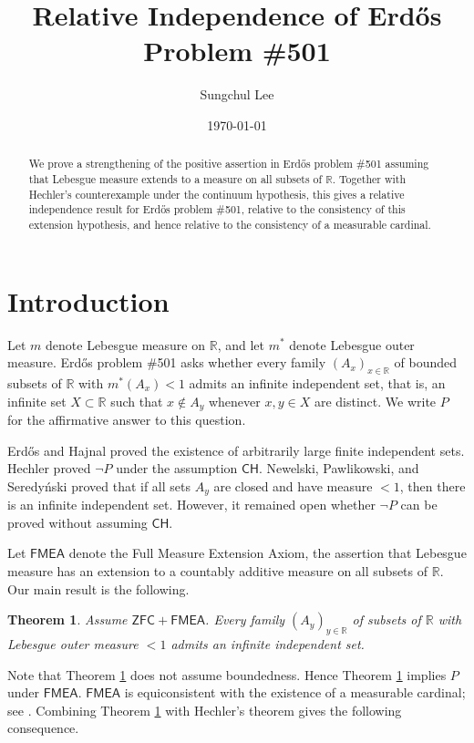 \documentclass{amsart}
\title{Relative Independence of Erd\H{o}s Problem \#501}
\author{Sungchul Lee}
\date{\today}
\theoremstyle{plain}
\newtheorem{theorem}{Theorem}[section]
\theoremstyle{definition}
\newcommand{\R}{\mathbb{R}}
\newcommand{\ZFC}{\mathsf{ZFC}}
\newcommand{\FMEA}{\mathsf{FMEA}}
\newcommand{\CH}{\mathsf{CH}}
\begin{document}
\begin{abstract}
We prove a strengthening of the positive assertion in Erd\H{o}s problem \#501 assuming that Lebesgue measure extends to a measure on all subsets of $\R$.
Together with Hechler's counterexample under the continuum hypothesis, this gives a relative independence result for Erd\H{o}s problem \#501, relative to the consistency of this extension hypothesis, and hence relative to the consistency of a measurable cardinal.
\end{abstract}

\maketitle

\section{Introduction}

Let $m$ denote Lebesgue measure on $\R$, and let $m^*$ denote Lebesgue outer measure.
Erd\H{o}s problem \#501 \cite{ErdosProblems501} asks whether every family $(A_x)_{x\in\R}$ of bounded subsets of $\R$ with $m^*(A_x)<1$ admits an infinite independent set, that is, an infinite set $X\subset\R$ such that $x\notin A_y$ whenever $x,y\in X$ are distinct.
We write $P$ for the affirmative answer to this question.

Erd\H{o}s and Hajnal \cite{ErdosHajnal1960} proved the existence of arbitrarily large finite independent sets.
Hechler \cite{Hechler1972} proved $\neg P$ under the assumption $\CH$.
Newelski, Pawlikowski, and Seredy\'nski \cite{NPS1987} proved that if all sets $A_y$ are closed and have measure $<1$, then there is an infinite independent set.
However, it remained open whether $\neg P$ can be proved without assuming $\CH$.

Let $\FMEA$ denote the Full Measure Extension Axiom, the assertion that Lebesgue measure has an extension to a countably additive measure on all subsets of $\R$.
Our main result is the following.

\begin{theorem}\label{thm:main}
Assume $\ZFC+\FMEA$.
Every family $(A_y)_{y\in\R}$ of subsets of $\R$ with Lebesgue outer measure $<1$ admits an infinite independent set.
\end{theorem}

Note that Theorem \ref{thm:main} does not assume boundedness.
Hence Theorem \ref{thm:main} implies $P$ under $\FMEA$.
$\FMEA$ is equiconsistent with the existence of a measurable cardinal; see \cite[1D(e), 2E]{FremlinRVM}.
Combining Theorem \ref{thm:main} with Hechler's theorem gives the following consequence.
\end{document}
